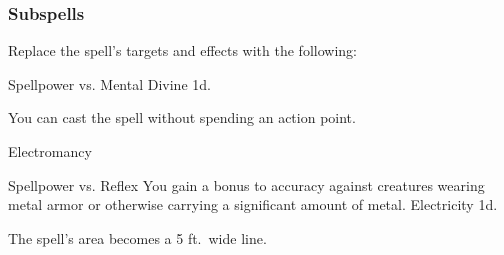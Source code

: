 \subsubsection{Subspells}
Replace the spell's targets and effects with the following:
\begin{spellcontent}
\begin{augmenttargetinginfo}
\end{augmenttargetinginfo}
\begin{augmenteffects}
\begin{spellattack}{Spellpower vs. Mental}
\spellsuccess Divine  \minus1d.
\end{spellattack}
\end{augmenteffects}
\end{spellcontent}
You can cast the spell without spending an action point.
\begin{spellsection}{Electromancy}
\begin{spellheader}
\end{spellheader}
\begin{spellcontent}
\begin{spelltargetinginfo}
\end{spelltargetinginfo}
\begin{spelleffects}
\begin{spellattack}{Spellpower vs. Reflex}
\spellspecial You gain a  bonus to accuracy against creatures wearing metal armor or otherwise carrying a significant amount of metal.
\spellsuccess
Electricity  \minus1d.
\end{spellattack}
\end{spelleffects}
\end{spellcontent}
\begin{spellfooter}
\end{spellfooter}
\begin{spellsubcontent}
\begin{spellcantrip}
The spell's area becomes a 5 ft.\ wide \areamed line.
\end{spellcantrip}
\end{spellsubcontent}
\end{spellsection}
